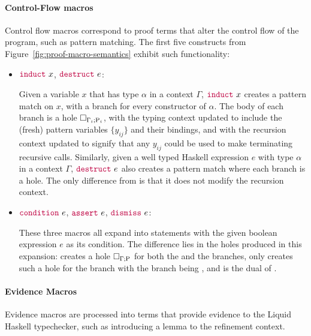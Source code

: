 \paragraph*{Control-Flow macros}

Control flow macros correspond to proof terms that alter the control
flow of the program, such as pattern matching. The first five
constructs from Figure~\ref{fig:proof-macro-semantics} exhibit such
functionality:

\begin{itemize}
\item ${\color{purple}\mathtt{induct}} ~ x$, ${\color{purple}\mathtt{destruct}} ~ e$:

  Given a variable $x$ that has type $\alpha$ in a context $\Gamma$,
  ${\color{purple}\mathtt{induct}} ~ x$ creates a pattern match on $x$, with a branch
  for every constructor of $\alpha$. The body of each branch is a hole
  $\Box_{\Gamma_i ; \mathrm{P}_i}$, with the typing context updated to
  include the (fresh) pattern variables $\{y_{ij}\}$ and their
  bindings, and with the recursion context updated to signify that any
  $y_{ij}$ could be used to make terminating recursive
  calls. Similarly, given a well typed Haskell expression $e$ with
  type $\alpha$ in a context $\Gamma$, ${\color{purple}\mathtt{destruct}} ~ e$ also
  creates a pattern match where each branch is a hole. The only
  difference from  is that it does not modify the
  recursion context.

\item ${\color{purple}\mathtt{condition}} ~ e$, ${\color{purple}\mathtt{assert}} ~ e$, ${\color{purple}\mathtt{dismiss}} ~ e$:

  These three macros all expand into  statements with the given
  boolean expression $e$ as its condition. The difference lies in the
  holes produced in this expansion:  creates a hole
  $\Box_{\Gamma ; \mathrm{P}}$ for both the  and the 
  branches,  only creates such a hole for the 
  branch with the  branch being , and 
  is the dual of .
\end{itemize}

\paragraph{Evidence Macros}

Evidence macros are processed into terms that provide evidence to the
Liquid Haskell typechecker, such as introducing a lemma to the
refinement context.

